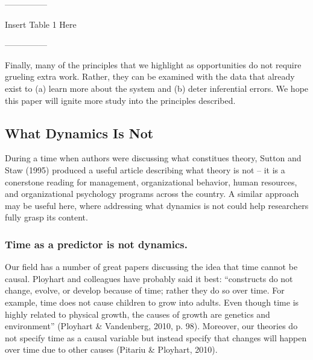 \documentclass[english,,man]{apa6}
\theoremstyle{definition}
\theoremstyle{definition}
\theoremstyle{definition}
\theoremstyle{remark}
\begin{document}
\begin{center}

---------------

Insert Table 1 Here

---------------

\end{center}

Finally, many of the principles that we highlight as opportunities do
not require grueling extra work. Rather, they can be examined with the
data that already exist to (a) learn more about the system and (b) deter
inferential errors. We hope this paper will ignite more study into the
principles described.

\hypertarget{what-dynamics-is-not}{%
\subsection{What Dynamics Is Not}\label{what-dynamics-is-not}}

During a time when authors were discussing what constitues theory,
Sutton and Staw (1995) produced a useful article describing what theory
is not -- it is a conerstone reading for management, organizational
behavior, human resources, and organizational psychology programs across
the country. A similar approach may be useful here, where addressing
what dynamics is not could help researchers fully grasp its content.

\hypertarget{time-as-a-predictor-is-not-dynamics.}{%
\subsubsection{Time as a predictor is not
dynamics.}\label{time-as-a-predictor-is-not-dynamics.}}

Our field has a number of great papers discussing the idea that time
cannot be causal. Ployhart and colleagues have probably said it best:
\enquote{constructs do not change, evolve, or develop because of time;
rather they do so over time. For example, time does not cause children
to grow into adults. Even though time is highly related to physical
growth, the causes of growth are genetics and environment} (Ployhart \&
Vandenberg, 2010, p. 98). Moreover, our theories do not specify time as
a causal variable but instead specify that changes will happen over time
due to other causes (Pitariu \& Ployhart, 2010).
\end{document}
